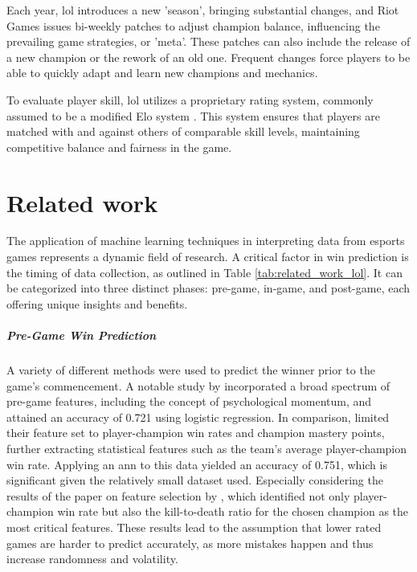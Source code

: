 \documentclass[12pt, a4paper, headinclude, twoside, plainheadsepline, open=right, numbers=noenddot, hidelinks, toc=listof, toc=bibliography]{scrreprt}
\begin{document}
Each year, \ac{lol} introduces a new 'season', bringing substantial changes, and Riot Games issues bi-weekly patches to adjust champion balance, influencing the prevailing game strategies, or 'meta'.
These patches can also include the release of a new champion or the rework of an old one.
Frequent changes force players to be able to quickly adapt and learn new champions and mechanics.

To evaluate player skill, \ac{lol} utilizes a proprietary rating system, commonly assumed to be a modified Elo system \cite{janssonNeuralNetworksStandardizing2022}.
This system ensures that players are matched with and against others of comparable skill levels, maintaining competitive balance and fairness in the game.

\chapter{Related work}
\label{chap:related}

The application of machine learning techniques in interpreting data from esports games represents a dynamic field of research. 
A critical factor in win prediction is the timing of data collection, as outlined in Table \ref{tab:related_work_lol}.
It can be categorized into three distinct phases: pre-game, in-game, and post-game, each offering unique insights and benefits.

\paragraph{Pre-Game Win Prediction}
A variety of different methods were used to predict the winner prior to the game's commencement.
A notable study by \citeauthor{whiteScalablePsychologicalMomentum2020} \cite{whiteScalablePsychologicalMomentum2020} incorporated a broad spectrum of pre-game features, including the concept of psychological momentum, and attained an accuracy of 0.721 using logistic regression.
In comparison, \citeauthor{doUsingMachineLearning2021} \cite{doUsingMachineLearning2021} 
limited their feature set to player-champion win rates and champion mastery points, further extracting statistical features such as the team's average player-champion win rate.
Applying an \ac{ann} to this data yielded an accuracy of 0.751, which is significant given the relatively small dataset used. 
Especially considering the results of the paper on feature selection by  \citeauthor{costaFeatureAnalysisLeague2021} \cite{costaFeatureAnalysisLeague2021}, which identified not only player-champion win rate but also the kill-to-death ratio for the chosen champion as the most critical features.
These results lead to the assumption that lower rated games are harder to predict accurately, as more mistakes happen and thus increase randomness and volatility.
\end{document}
